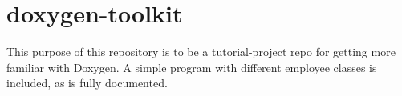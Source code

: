 \chapter{doxygen-\/toolkit}
\hypertarget{md_README}{}\label{md_README}
\label{md_README_autotoc_md0}%
%
 This purpose of this repository is to be a tutorial-\/project repo for getting more familiar with Doxygen. A simple program with different employee classes is included, as is fully documented. 